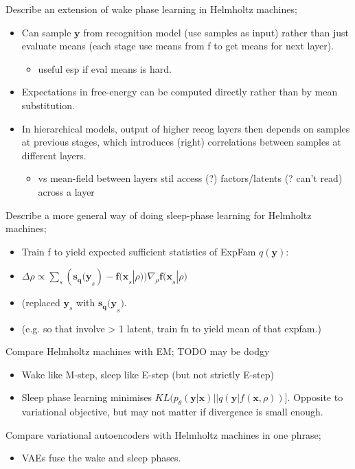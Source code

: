 \documentclass{article}
\begin{document}
Describe an extension of wake phase learning in Helmholtz machines; \begin{itemize}
    \item Can sample $\bm{y}$ from recognition model (use samples as input) rather than just evaluate means (each stage use means from f to get means for next layer). \begin{itemize}
        \item useful esp if eval means is hard.
    \end{itemize}
    \item Expectations in free-energy can be computed directly rather than by mean substitution.
    \item In hierarchical models, output of higher recog layers then depends on samples at previous stages, which introduces (right) correlations between samples at different layers. \begin{itemize}
        \item vs mean-field between layers stil access (?) factors/latents (? can't read) across a layer
    \end{itemize}
\end{itemize}

Describe a more general way of doing sleep-phase learning for Helmholtz machines; \begin{itemize}
    \item Train f to yield expected sufficient statistics of ExpFam $q(\bm{y})$: \item $\Delta \rho \propto \sum_s (\bm{s_q(y}_s) - \bm{f(x}_s | \rho))\nabla_\rho \bm{f(x}_s|\rho)$
    \item (replaced $\bm{y}_s$ with $\bm{s_q(y}_s)$.
    \item (e.g. so that involve > 1 latent, train fn to yield mean of that expfam.)
\end{itemize}

Compare Helmholtz machines with EM; TODO may be dodgy \begin{itemize}
    \item Wake like M-step, sleep like E-step (but not strictly E-step)
    \item Sleep phase learning minimises $KL(p_\theta(\bm{y|x})||q(\bm{y}|f(\bm{x},\rho))]$. Opposite to variational objective, but may not matter if divergence is small enough.
\end{itemize}

Compare variational autoencoders with Helmholtz machines in one phrase; \begin{itemize}
    \item VAEs fuse the wake and sleep phases.
\end{itemize}
\end{document}
